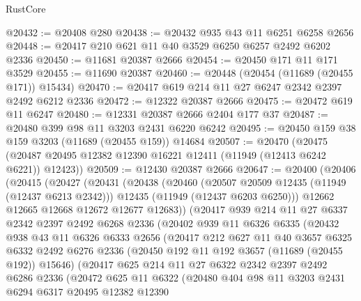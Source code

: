 \begin{lexlean}{RustCore}
\begin{coremodule}
@20432 := @20408 @280
@20438 := @20432 @935 @43 @11 @6251 @6258 @2656
@20448 := @20417 @210 @621 @11 @40 @3529 @6250 @6257 @2492 @6202 @2336
@20450 := @11681 @20387 @2666
@20454 := @20450 @171 @11 @171 @3529
@20455 := @11690 @20387
@20460 := @20448 (@20454 (@11689 (@20455 @171)) @15434)
@20470 := @20417 @619 @214 @11 @27 @6247 @2342 @2397 @2492 @6212 @2336
@20472 := @12322 @20387 @2666
@20475 := @20472 @619 @11 @6247
@20480 := @12331 @20387 @2666 @2404 @177 @37
@20487 := @20480 @399 @98 @11 @3203 @2431 @6220 @6242
@20495 := @20450 @159 @38 @159 @3203 (@11689 (@20455 @159)) @14684
@20507 := @20470
    (@20475 (@20487 @20495 @12382 @12390 @16221 @12411 (@11949 (@12413 @6242 @6221)) @12423))
@20509 := @12430 @20387 @2666
@20647 := @20400
    (@20406
      (@20415
        (@20427
          (@20431
            (@20438
              (@20460
                (@20507 @20509 @12435 (@11949 (@12437 @6213 @2342)))
                @12435
                (@11949 (@12437 @6203 @6250)))
              @12662
              @12665
              @12668
              @12672
              @12677
              @12683))
          (@20417
            @939
            @214
            @11
            @27
            @6337
            @2342
            @2397
            @2492
            @6268
            @2336
            (@20402
              @939
              @11
              @6326
              @6335
              (@20432
                @938
                @43
                @11
                @6326
                @6333
                @2656
                (@20417
                  @212
                  @627
                  @11
                  @40
                  @3657
                  @6325
                  @6332
                  @2492
                  @6276
                  @2336
                  (@20450 @192 @11 @192 @3657 (@11689 (@20455 @192)) @15646)
                  (@20417
                    @625
                    @214
                    @11
                    @27
                    @6322
                    @2342
                    @2397
                    @2492
                    @6286
                    @2336
                    (@20472
                      @625
                      @11
                      @6322
                      (@20480
                        @404
                        @98
                        @11
                        @3203
                        @2431
                        @6294
                        @6317
                        @20495
                        @12382
                        @12390

\end{coremodule}
\end{lexlean}
